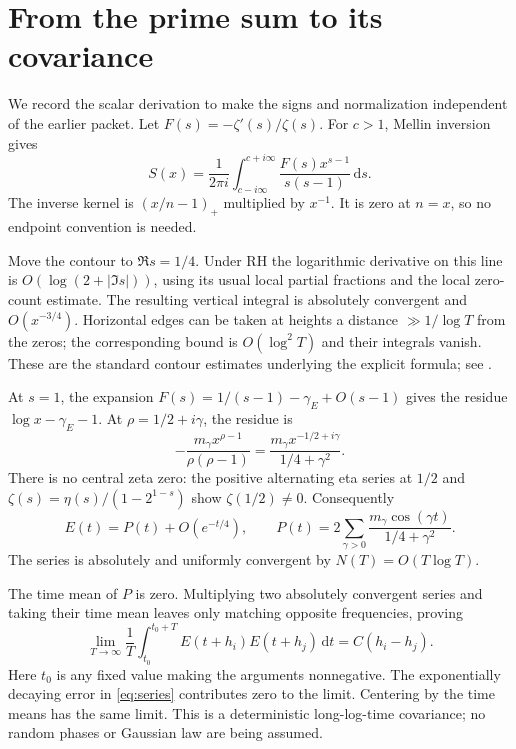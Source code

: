 \documentclass[11pt]{article}
\theoremstyle{definition}\newtheorem{definition}[theorem]{Definition}
\theoremstyle{remark}\newtheorem{remark}[theorem]{Remark}
\newcommand{\dd}{\,\mathrm d}
\begin{document}
\section{From the prime sum to its covariance}\label{sec:signal}
We record the scalar derivation to make the signs and normalization
independent of the earlier packet. Let
$F(s)=-\zeta'(s)/\zeta(s)$. For $c>1$, Mellin inversion gives
\begin{equation}\label{eq:mellin}
 S(x)=\frac1{2\pi i}\int_{c-i\infty}^{c+i\infty}
      \frac{F(s)x^{s-1}}{s(s-1)}\dd s.
\end{equation}
The inverse kernel is $(x/n-1)_+$ multiplied by $x^{-1}$.
It is zero at $n=x$, so no endpoint convention is needed.

Move the contour to $\Re s=1/4$. Under RH the logarithmic derivative on
this line is $O(\log(2+|\Im s|))$, using its usual local partial fractions
and the local zero-count estimate. The resulting vertical integral is
absolutely convergent and $O(x^{-3/4})$. Horizontal edges can be taken
at heights a distance $\gg1/\log T$ from the zeros; the corresponding
bound is $O(\log^2 T)$ and their integrals vanish. These are the standard
contour estimates underlying the explicit formula; see \cite{kouk}.

At $s=1$, the expansion
$F(s)=1/(s-1)-\gamma_E+O(s-1)$ gives the residue
$\log x-\gamma_E-1$. At $\rho=1/2+i\gamma$, the residue is
\[
 -\frac{m_\gamma x^{\rho-1}}{\rho(\rho-1)}
 =\frac{m_\gamma x^{-1/2+i\gamma}}{1/4+\gamma^2}.
\]
There is no central zeta zero: the positive alternating eta series at
$1/2$ and $\zeta(s)=\eta(s)/(1-2^{1-s})$ show
$\zeta(1/2)\ne0$. Consequently
\begin{equation}\label{eq:series}
 E(t)=P(t)+O(e^{-t/4}),\qquad
 P(t)=2\sum_{\gamma>0}\frac{m_\gamma\cos(\gamma t)}{1/4+\gamma^2}.
\end{equation}
The series is absolutely and uniformly convergent by
$N(T)=O(T\log T)$.

The time mean of $P$ is zero. Multiplying two absolutely convergent
series and taking their time mean leaves only matching opposite
frequencies, proving
\begin{equation}\label{eq:covariance}
 \lim_{T\to\infty}\frac1T\int_{t_0}^{t_0+T}
 E(t+h_i)E(t+h_j)\dd t=C(h_i-h_j).
\end{equation}
Here $t_0$ is any fixed value making the arguments nonnegative.
The exponentially decaying error in \eqref{eq:series} contributes zero
to the limit. Centering by the time means has the same limit. This is a
deterministic long-log-time covariance; no random phases or Gaussian
law are being assumed.
\end{document}
